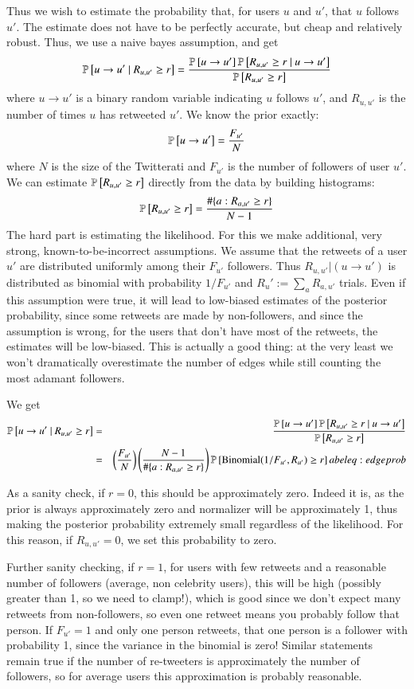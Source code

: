 Thus we wish to estimate the probability that, for users $u$ and $u'$, that $u$ follows $u'$.
The estimate does not have to be perfectly accurate, but cheap and relatively robust.  
Thus, we use a naive bayes assumption, and get
\[\mathbb{P} \left[u\to u'~|~R_{u,u'}\ge r\right] = \frac{\mathbb{P} \left[u\to u'\right]\mathbb{P} \left[R_{u,u'}\ge r~|~u\to u'\right]}{\mathbb{P} \left[R_{u,u'}\ge r\right]}\]
where $u\to u'$ is a binary random variable indicating $u$ follows $u'$, and $R_{u,u'}$ is the number of times $u$ has retweeted $u'$.  
We know the prior exactly:
\[\mathbb{P} \left[u\to u'\right]=\frac{F_{u'}}{N}\]
where $N$ is the size of the Twitterati and $F_{u'}$ is the number of followers of user $u'$.
We can estimate $\mathbb{P} \left[R_{u,u'} \ge r\right]$ directly from the data by building histograms:
\[\mathbb{P} \left[R_{u,u'} \ge r\right]=\frac{\#\{a : R_{a,u'}\ge r\}}{N-1}\]
The hard part is estimating the likelihood.  For this we make additional, very strong, known-to-be-incorrect assumptions.
We assume that the retweets of a user $u'$ are distributed uniformly among their $F_{u'}$ followers.  
Thus $R_{u,u'}|(u\to u')$ is distributed as binomial with probability $1/F_{u'}$ and $R_u':=\sum_a R_{a,u'}$ trials.  
Even if this assumption were true, it will lead to low-biased estimates of the posterior probability, since some retweets are made by non-followers, and since the assumption is wrong, for the users that don't have most of the retweets, the estimates will be low-biased.
This is actually a good thing: at the very least we won't dramatically overestimate the number of edges while still counting the most adamant followers.  

We get
\begin{eqnarray}
  \mathbb{P} \left[u\to u'~|~R_{u,u'}\ge r\right] &=& \frac{\mathbb{P} \left[u\to u'\right]\mathbb{P} \left[R_{u,u'}\ge r~|~u\to u'\right]}{\mathbb{P} \left[R_{u,u'}\ge r\right]}\nonumber\\
  &=& \left(\frac{F_{u'}}{N}\right)\left(\frac{N-1}{\#\{a : R_{a,u'}\ge r\}}\right)\mathbb{P} \left[\mbox{Binomial}(1/F_{u'},R_{u'}) \ge r\right]\nonumber
abel{eq:edgeprob}
\end{eqnarray}

As a sanity check, if $r=0$, this should be approximately zero.
Indeed it is, as the prior is always approximately zero and normalizer will be approximately 1, thus making the posterior probability extremely small regardless of the likelihood.  
For this reason, if $R_{u,u'}=0$, we set this probability to zero.

Further sanity checking, if $r=1$, for users with few retweets and a reasonable number of followers (average, non celebrity users), this will be high (possibly greater than 1, so we need to clamp!), which is good since we don't expect many retweets from non-followers, so even one retweet means you probably follow that person.  
If $F_{u'}=1$ and only one person retweets, that one person is a follower with probability 1, since the variance in the binomial is zero!  Similar statements remain true if the number of re-tweeters is approximately the number of followers, so for average users this approximation is probably reasonable.  

